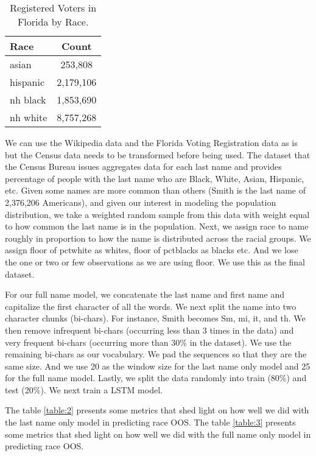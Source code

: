 \documentclass[12pt, letterpaper]{article}
\begin{document}
\begin{table}[h!]
\centering
\caption{Registered Voters in Florida by Race.}
\begin{tabular}{ l c }
\hline	
Race & Count \\
\hline
asian & 253,808 \\
hispanic & 2,179,106 \\
nh black & 1,853,690 \\
nh white & 8,757,268 \\
\hline
\end{tabular}
\label{table:1}
\end{table}

We can use the Wikipedia data and the Florida Voting Registration data as is but the Census data needs to be transformed before being used. The dataset that the Census Bureau issues aggregates data for each last name and provides percentage of people with the last name who are Black, White, Asian, Hispanic, etc. Given some names are more common than others (Smith is the last name of 2,376,206 Americans), and given our interest in modeling the population distribution, we take a weighted random sample from this data with weight equal to how common the last name is in the population. Next, we assign race to name roughly in proportion to how the name is distributed across the racial groups. We assign floor of pctwhite as whites, floor of pctblacks as blacks etc. And we lose the one or two or few observations as we are using floor. We use this as the final dataset.

For our full name model, we concatenate the last name and first name and capitalize the first character of all the words. We next split the name into two character chunks (bi-chars). For instance, Smith becomes Sm, mi, it, and th. We then remove infrequent bi-chars (occurring less than 3 times in the data) and very frequent bi-chars (occurring more than 30\% in the dataset). We use the remaining bi-chars as our vocabulary. We pad the sequences so that they are the same size. And we use 20 as the window size for the last name only model and 25 for the full name model. Lastly, we split the data randomly into train (80\%) and test (20\%). We next train a LSTM model. 

The table \ref{table:2} presents some metrics that shed light on how well we did with the last name only model in predicting race OOS.  The table \ref{table:3} presents some metrics that shed light on how well we did with the full  name only model in predicting race OOS.  
\end{document}
